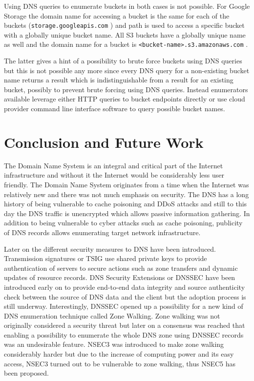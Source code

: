 Using DNS queries to enumerate buckets in both cases is not possible. For Google Storage the domain name for accessing a bucket is the same for each of the buckets (\texttt{storage.googleapis.com} \cite{googlebuckets}) and path is used to access a specific bucket with a globally unique bucket name. All S3 buckets have a globally unique name as well and the domain name for a bucket is \texttt{<bucket-name>.s3.amazonaws.com} \cite{s3buckets}.

The latter gives a hint of a possibility to brute force buckets using DNS queries but this is not possible any more \cite{S3enum} since every DNS query for a non-existing bucket name returns a result which is indistinguishable  from a result for an existing bucket, possibly to prevent brute forcing using DNS queries. Instead enumerators available leverage either HTTP queries to bucket endpoints directly or use cloud provider command line interface software to query possible bucket names.

\section{Conclusion and Future Work}

The Domain Name System is an integral and critical part of the Internet infrastructure and without it the Internet would be considerably less user friendly. The Domain Name System originates from a time when the Internet was relatively new and there was not much emphasis on security. The DNS has a long history of being vulnerable to cache poisoning and DDoS attacks and still to this day the DNS traffic is unencrypted which allows passive information gathering. In addition to being vulnerable to cyber attacks such as cache poisoning, publicity of DNS records allows enumerating target network infrastructure.

Later on the different security measures to DNS have been introduced. Transmission signatures or TSIG use shared private keys to provide authentication of servers to secure actions such as zone transfers and dynamic updates of resource records. DNS Security Extensions or DNSSEC have been introduced early on to provide end-to-end data integrity and source authenticity check between the source of DNS data and the client but the adoption process is still underway. Interestingly, DNSSEC opened up a possibility for a new kind of DNS enumeration technique called Zone Walking. Zone walking was not originally considered a security threat but later on a consensus was reached that enabling a possibility to enumerate the whole DNS zone using DNSSEC records was an undesirable feature. NSEC3 was introduced to make zone walking considerably harder but due to the increase of computing power and its easy access, NSEC3 turned out to be vulnerable to zone walking, thus NSEC5 has been proposed.

